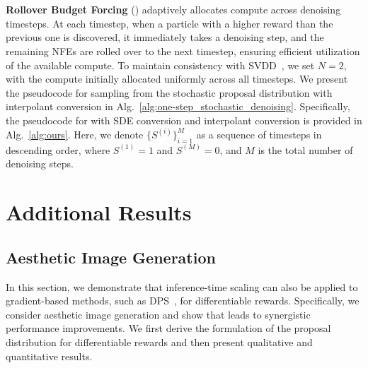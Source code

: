\\
\\
\textbf{Rollover Budget Forcing} (\Ours{}) adaptively allocates compute across denoising timesteps. 
At each timestep, when a particle with a higher reward than the previous one is discovered, it immediately takes a denoising step, and the remaining NFEs are rolled over to the next timestep, ensuring efficient utilization of the available compute. To maintain consistency with SVDD~\cite{Li2024:SVDD}, we set $N=2$, with the compute initially allocated uniformly across all timesteps. 
We present the pseudocode for sampling from the stochastic proposal distribution with interpolant conversion in Alg.~\ref{alg:one-step_stochastic_denoising}. Specifically, the pseudocode for \Ours{} with SDE conversion and interpolant conversion is provided in Alg.~\ref{alg:ours}. 
Here, we denote $\{S^{(i)}\}_{i=1}^{M}$ as a sequence of timesteps in descending order, where $S^{(1)} = 1$ and $S^{(M)} = 0$, and $M$ is the total number of denoising steps. 






% 
\section{Additional Results}
\subsection{Aesthetic Image Generation}
\label{sec:appendix_diff_reward}
In this section, we demonstrate that inference-time scaling can also be applied to gradient-based methods, such as DPS~\cite{Chung:2023DPS}, for differentiable rewards. Specifically, we consider aesthetic image generation and show that \Ours{} leads to synergistic performance improvements. We first derive the formulation of the proposal distribution for differentiable rewards and then present qualitative and quantitative results. 

